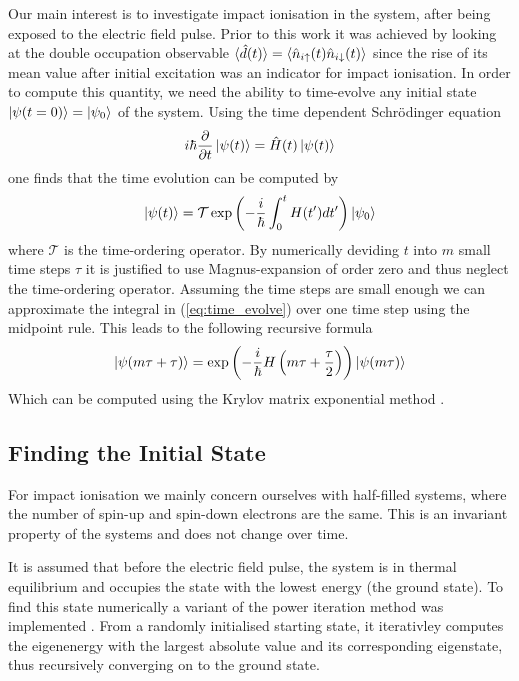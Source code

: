 Our main interest is to investigate impact ionisation in the system, after being exposed to the electric field pulse. Prior to this work it was achieved by looking at the double occupation observable $\braket{\hat{d}(t)} = \braket{\hat{n}_{i\uparrow}(t) \hat{n}_{i\downarrow}(t)}$ since the rise of its mean value after initial excitation was an indicator for impact ionisation. In order to compute this quantity, we need the ability to time-evolve any initial state $\ket{\psi(t=0)} = \ket{\psi_0}$ of the system. Using the time dependent Schrödinger equation
\begin{equation}
    i\hbar \frac{\partial}{\partial t}\ket{\psi(t)} = \hat{H}(t)\ket{\psi(t)}\label{eq:time_evolve}
\end{equation}
one finds that the time evolution can be computed by
\begin{equation}
    \ket{\psi (t)} = \mathcal{T} \exp\left(-\frac{i}{\hbar}\int_0^t H(t') dt'\right) \ket{\psi_0}
\end{equation}
where $\mathcal{T}$ is the time-ordering operator. By numerically deviding $t$ into $m$ small time steps $\tau$ it is justified to use Magnus-expansion \cite{magnus} of order zero and thus neglect the time-ordering operator. Assuming the time steps are small enough we can approximate the integral in (\ref{eq:time_evolve}) over one time step using the midpoint rule. This leads to the following recursive formula
\begin{equation}
    \ket{\psi(m\tau + \tau)} = \exp\left(-\frac{i}{\hbar} H\left(m\tau + \frac{\tau}{2}\right)\right)\ket{\psi(m\tau)}
\end{equation}
Which can be computed using the Krylov matrix exponential method \cite{innerberger}.


\subsection{Finding the Initial State}
For impact ionisation we mainly concern ourselves with half-filled systems, where the number of spin-up and spin-down electrons are the same. This is an invariant property of the systems and does not change over time.
\medskip

It is assumed that before the electric field pulse, the system is in thermal equilibrium and occupies the state with the lowest energy (the ground state). To find this state numerically a variant of the power iteration method was implemented \cite{innerberger}. From a randomly initialised starting state, it iterativley computes the eigenenergy with the largest absolute value and its corresponding eigenstate, thus recursively converging on to the ground state.


